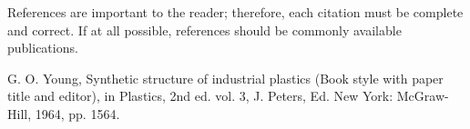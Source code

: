 \documentclass[letterpaper, 10 pt, conference]{ieeeconf}  %
\begin{document}

References are important to the reader; therefore, each citation must be complete and correct. If at all possible, references should be commonly available publications.



\begin{thebibliography}{99}

 G. O. Young, Synthetic structure of industrial plastics (Book style with paper title and editor), 	in Plastics, 2nd ed. vol. 3, J. Peters, Ed.  New York: McGraw-Hill, 1964, pp. 1564.







\end{thebibliography}
\end{document}
